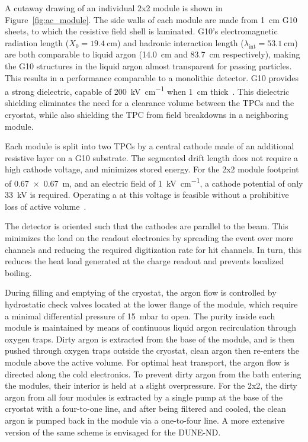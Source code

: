 A cutaway drawing of an individual 2x2 module is shown in Figure~\ref{fig:ac_module}. The side walls of each module are made from \SI{1}{\centi\metre} G10 sheets, to which the resistive field shell is laminated. G10's electromagnetic radiation length ($X_{\mathrm{0}} = \SI{19.4}{\centi\metre}$) and hadronic interaction length ($\lambda_{\mathrm{int}} = \SI{53.1}{\centi\metre}$)~\cite{Tanabashi:2018oca} %
are both comparable to liquid argon (14.0~cm and 83.7~cm respectively), making the G10 structures in the liquid argon almost transparent for passing particles. This results in a performance comparable to a monolithic detector. G10 provides a strong dielectric, capable of \SI{200}{\kilo\volt\per\centi\metre} when \SI{1}{\centi\metre} thick~\cite{G10Breakdown}. This dielectric shielding eliminates the need for a clearance volume between the TPCs and the cryostat, while also shielding the TPC from field breakdowns in a neighboring module. 

Each module is split into two TPCs by a central cathode made of an additional resistive layer on a G10 substrate. The segmented drift length does not require a high cathode voltage, and minimizes stored energy. For the 2x2 module footprint of \SI{0.67 x 0.67}{\metre}, and an electric field of \SI{1}{\kilo\volt\per\centi\metre}, a cathode potential of only \SI{33}{\kilo\volt} is required. Operating a  at this voltage is feasible without a prohibitive loss of active volume~\cite{Zeller:2013sva}.

The detector is oriented such that the cathodes are parallel to the beam. This minimizes the load on the readout electronics by spreading the event over more channels and reducing the required digitization rate for hit channels. In turn, this reduces the heat load generated at the charge readout and prevents localized boiling.

During filling and emptying of the cryostat, the argon flow is controlled by hydrostatic check valves located at the lower flange of the module, which require a minimal differential pressure of \SI{15}{\milli\bar} to open. The purity inside each module is maintained by means of continuous liquid argon recirculation through oxygen traps. Dirty argon is extracted from the base of the module, and is then pushed through oxygen traps outside the cryostat, clean argon then re-enters the module above the active volume. For optimal heat transport, the argon flow is directed along the cold electronics. To prevent dirty argon from the bath entering the modules, their interior is held at a slight overpressure. For the 2x2, the dirty argon from all four modules is extracted by a single pump at the base of the cryostat with a four-to-one line, and after being filtered and cooled, the clean argon is pumped back in the module via a one-to-four line.
A more extensive version of the same scheme is envisaged for the DUNE-ND.  


